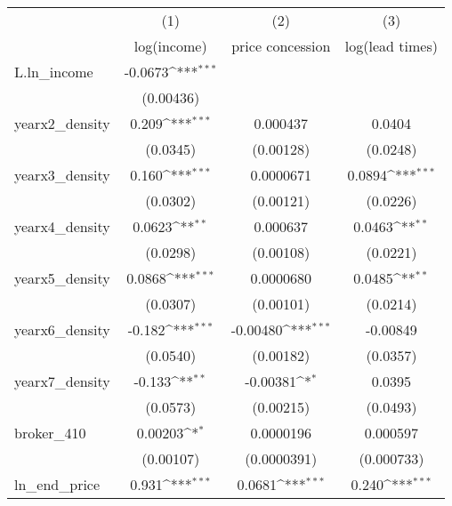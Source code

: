 {
\def\sym#1{\ifmmode^{#1}\else\(^{#1}\)\fi}
\begin{tabular}{l*{3}{c}}
\toprule
            &\multicolumn{1}{c}{(1)}&\multicolumn{1}{c}{(2)}&\multicolumn{1}{c}{(3)}\\
            &\multicolumn{1}{c}{log(income)}&\multicolumn{1}{c}{price concession}&\multicolumn{1}{c}{log(lead times)}\\
\midrule
L.ln\_income &     -0.0673\sym{***}&                     &                     \\
            &   (0.00436)         &                     &                     \\
\addlinespace
yearx2\_density&       0.209\sym{***}&    0.000437         &      0.0404         \\
            &    (0.0345)         &   (0.00128)         &    (0.0248)         \\
\addlinespace
yearx3\_density&       0.160\sym{***}&   0.0000671         &      0.0894\sym{***}\\
            &    (0.0302)         &   (0.00121)         &    (0.0226)         \\
\addlinespace
yearx4\_density&      0.0623\sym{**} &    0.000637         &      0.0463\sym{**} \\
            &    (0.0298)         &   (0.00108)         &    (0.0221)         \\
\addlinespace
yearx5\_density&      0.0868\sym{***}&   0.0000680         &      0.0485\sym{**} \\
            &    (0.0307)         &   (0.00101)         &    (0.0214)         \\
\addlinespace
yearx6\_density&      -0.182\sym{***}&    -0.00480\sym{***}&    -0.00849         \\
            &    (0.0540)         &   (0.00182)         &    (0.0357)         \\
\addlinespace
yearx7\_density&      -0.133\sym{**} &    -0.00381\sym{*}  &      0.0395         \\
            &    (0.0573)         &   (0.00215)         &    (0.0493)         \\
\addlinespace
broker\_410  &     0.00203\sym{*}  &   0.0000196         &    0.000597         \\
            &   (0.00107)         & (0.0000391)         &  (0.000733)         \\
\addlinespace
ln\_end\_price&       0.931\sym{***}&      0.0681\sym{***}&       0.240\sym{***}\\

\end{tabular}}
